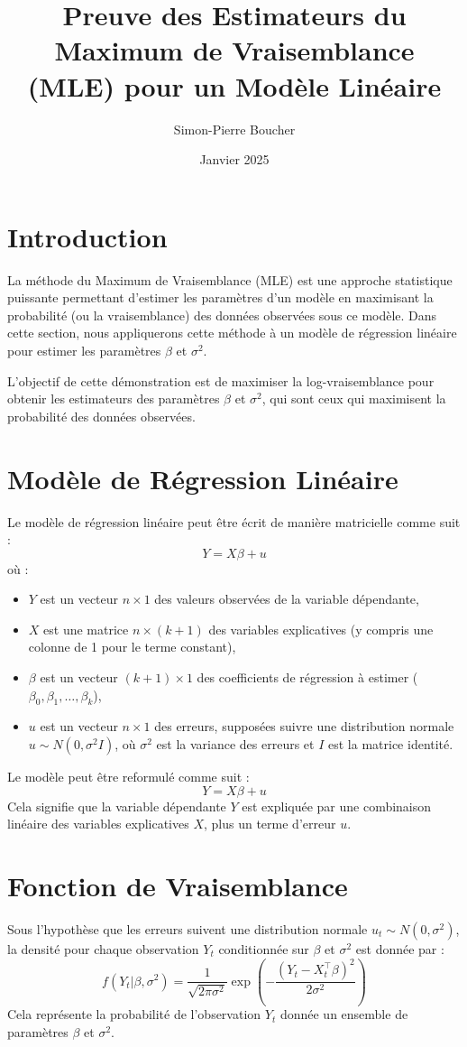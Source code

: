 \documentclass[14pt]{extarticle} %
\title{Preuve des Estimateurs du Maximum de Vraisemblance (MLE) pour un Modèle Linéaire}
\author{Simon-Pierre Boucher}
\date{Janvier 2025}
\begin{document}
\maketitle
\tableofcontents
\newpage

\section{Introduction}
La méthode du Maximum de Vraisemblance (MLE) est une approche statistique puissante permettant d'estimer les paramètres d'un modèle en maximisant la probabilité (ou la vraisemblance) des données observées sous ce modèle. Dans cette section, nous appliquerons cette méthode à un modèle de régression linéaire pour estimer les paramètres \(\beta\) et \(\sigma^2\).

L'objectif de cette démonstration est de maximiser la log-vraisemblance pour obtenir les estimateurs des paramètres \(\beta\) et \(\sigma^2\), qui sont ceux qui maximisent la probabilité des données observées.

\section{Modèle de Régression Linéaire}
Le modèle de régression linéaire peut être écrit de manière matricielle comme suit :
\[
Y = X\beta + u
\]
où :
\begin{itemize}
    \item \(Y\) est un vecteur \(n \times 1\) des valeurs observées de la variable dépendante,
    \item \(X\) est une matrice \(n \times (k+1)\) des variables explicatives (y compris une colonne de 1 pour le terme constant),
    \item \(\beta\) est un vecteur \( (k+1) \times 1 \) des coefficients de régression à estimer (\(\beta_0, \beta_1, \dots, \beta_k\)),
    \item \(u\) est un vecteur \(n \times 1\) des erreurs, supposées suivre une distribution normale \(u \sim N(0, \sigma^2I)\), où \(\sigma^2\) est la variance des erreurs et \(I\) est la matrice identité.
\end{itemize}

Le modèle peut être reformulé comme suit :
\[
Y = X\beta + u
\]
Cela signifie que la variable dépendante \(Y\) est expliquée par une combinaison linéaire des variables explicatives \(X\), plus un terme d'erreur \(u\).

\section{Fonction de Vraisemblance}
Sous l'hypothèse que les erreurs suivent une distribution normale \(u_t \sim N(0, \sigma^2)\), la densité pour chaque observation \(Y_t\) conditionnée sur \(\beta\) et \(\sigma^2\) est donnée par :
\[
f(Y_t | \beta, \sigma^2) = \frac{1}{\sqrt{2\pi \sigma^2}} \exp\left( -\frac{(Y_t - X_t^\top \beta)^2}{2\sigma^2} \right)
\]
Cela représente la probabilité de l'observation \(Y_t\) donnée un ensemble de paramètres \(\beta\) et \(\sigma^2\).
\end{document}
